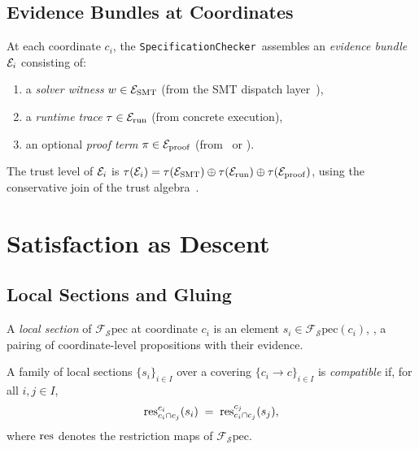 \documentclass[11pt]{article}
\newcommand{\Spec}{\mathcal{S}\mathrm{pec}}        %
\newcommand{\LocalSec}[1]{s_{#1}}                  %
\newcommand{\SpecificationChecker}{\texttt{SpecificationChecker}}
\begin{document}
\subsection{Evidence Bundles at Coordinates}

At each coordinate $c_i$, the \SpecificationChecker\ assembles an
\emph{evidence bundle} $\mathcal{E}_i$ consisting of:
\begin{enumerate}[leftmargin=2em,label=(\roman*)]
  \item a \emph{solver witness} $w \in \mathcal{E}_{\mathrm{SMT}}$
        (from the SMT dispatch layer~\cite{JuGeo05}),
  \item a \emph{runtime trace} $\tau \in \mathcal{E}_{\mathrm{run}}$
        (from concrete execution),
  \item an optional \emph{proof term} $\pi \in \mathcal{E}_{\mathrm{proof}}$
        (from \LEAN\ or \Coq).
\end{enumerate}
The trust level of $\mathcal{E}_i$ is $\tau(\mathcal{E}_i) =
\tau(\mathcal{E}_{\mathrm{SMT}}) \oplus \tau(\mathcal{E}_{\mathrm{run}}) \oplus
\tau(\mathcal{E}_{\mathrm{proof}})$, using the conservative join of the
trust algebra~\cite{JuGeo04}.

\section{Satisfaction as Descent}\label{sec:descent}

\subsection{Local Sections and Gluing}\label{sec:local-sections}

\begin{definition}\label{def:local-section}
A \emph{local section} of $\mathcal{F}_\Spec$ at coordinate $c_i$ is
an element $\LocalSec{i} \in \mathcal{F}_\Spec(c_i)$, \ie,
a pairing of coordinate-level propositions with their evidence.
\end{definition}

\begin{definition}\label{def:compatible}
A family of local sections $\{\LocalSec{i}\}_{i \in I}$ over a
covering $\{c_i \to c\}_{i \in I}$ is \emph{compatible} if, for all
$i, j \in I$,
\[
  \res_{c_i \cap c_j}^{c_i}(\LocalSec{i})
  \;=\;
  \res_{c_i \cap c_j}^{c_j}(\LocalSec{j}),
\]
where $\mathrm{res}$ denotes the restriction maps of $\mathcal{F}_\Spec$.
\end{definition}
\end{document}
